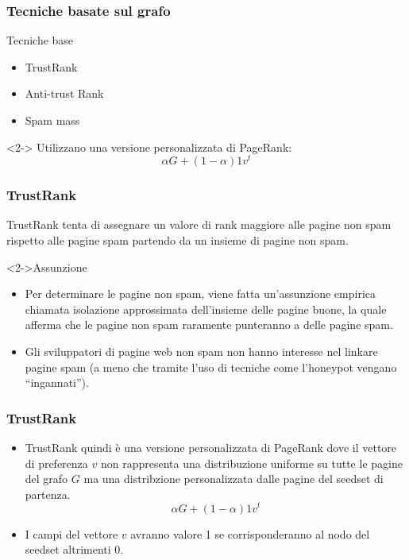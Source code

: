 \documentclass{beamer}
\begin{document}
\begin{frame}
  \frametitle{Tecniche basate sul grafo}
  \begin{block}{Tecniche base}
  \begin{itemize}
  \item TrustRank
  \item Anti-trust Rank
  \item Spam mass
  \end{itemize}
  \end{block}
  \begin{block}<2->{}
  Utilizzano una versione personalizzata di PageRank:
  \begin{equation}
   \alpha G + (1-\alpha)1v^t
   \label{eqn:pagerank}
  \end{equation}
  \end{block}
  \end{frame}
\begin{frame}
  \frametitle{TrustRank}
  TrustRank tenta di assegnare un valore di rank maggiore alle pagine non spam rispetto alle pagine spam partendo da un insieme di pagine non spam.
  \begin{block}<2->{Assunzione}
  \begin{itemize}
   \item Per determinare le pagine non spam, viene fatta un’assunzione empirica chiamata isolazione approssimata dell’insieme delle pagine buone, la quale afferma che le pagine non spam raramente punteranno a delle pagine spam.
   \item Gli sviluppatori di pagine web non spam non hanno interesse nel linkare pagine spam (a meno che tramite l’uso di tecniche come l’honeypot vengano “ingannati”).
  \end{itemize}
  \end{block}
\end{frame}
\begin{frame}
  \frametitle{TrustRank}
  \begin{itemize}
   \item   TrustRank quindi è una versione personalizzata di PageRank dove il vettore di preferenza \(v\) non rappresenta una distribuzione uniforme su tutte le pagine del grafo \(G\) ma una distribzione personalizzata dalle pagine del seedset di partenza.
$$
   \alpha G + (1-\alpha)1v^t
$$
\item I campi del vettore \(v\) avranno valore 1 se corrisponderanno al nodo del seedset altrimenti 0.
  \end{itemize}
\end{frame}
\end{document}
